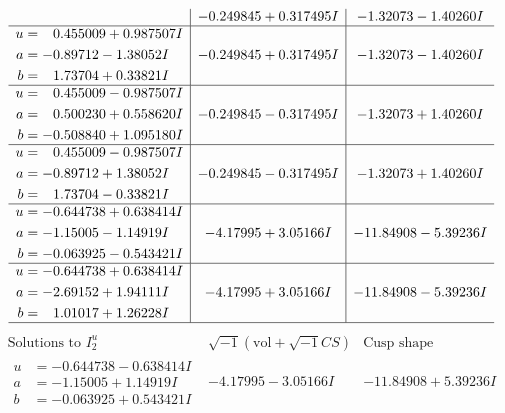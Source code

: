 \documentclass[1p]{elsarticle_modified}
\theoremstyle{definition}
\newcommand{\I}{\sqrt{-1}}
\begin{document}
$$\begin{array}{c|c|c}
 & -0.249845 + 0.317495 I & -1.32073 - 1.40260 I \\ \hline\begin{aligned}
u &= \phantom{-}0.455009 + 0.987507 I \\
a &= -0.89712 - 1.38052 I \\
b &= \phantom{-}1.73704 + 0.33821 I\end{aligned}
 & -0.249845 + 0.317495 I & -1.32073 - 1.40260 I \\ \hline\begin{aligned}
u &= \phantom{-}0.455009 - 0.987507 I \\
a &= \phantom{-}0.500230 + 0.558620 I \\
b &= -0.508840 + 1.095180 I\end{aligned}
 & -0.249845 - 0.317495 I & -1.32073 + 1.40260 I \\ \hline\begin{aligned}
u &= \phantom{-}0.455009 - 0.987507 I \\
a &= -0.89712 + 1.38052 I \\
b &= \phantom{-}1.73704 - 0.33821 I\end{aligned}
 & -0.249845 - 0.317495 I & -1.32073 + 1.40260 I \\ \hline\begin{aligned}
u &= -0.644738 + 0.638414 I \\
a &= -1.15005 - 1.14919 I \\
b &= -0.063925 - 0.543421 I\end{aligned}
 & -4.17995 + 3.05166 I & -11.84908 - 5.39236 I \\ \hline\begin{aligned}
u &= -0.644738 + 0.638414 I \\
a &= -2.69152 + 1.94111 I \\
b &= \phantom{-}1.01017 + 1.26228 I\end{aligned}
 & -4.17995 + 3.05166 I & -11.84908 - 5.39236 I\\
 \hline 
 \end{array}$$\newpage$$\begin{array}{c|c|c}  
\text{Solutions to }I^u_{2}& \I (\text{vol} + \sqrt{-1}CS) & \text{Cusp shape}\\
 \hline 
\begin{aligned}
u &= -0.644738 - 0.638414 I \\
a &= -1.15005 + 1.14919 I \\
b &= -0.063925 + 0.543421 I\end{aligned}
 & -4.17995 - 3.05166 I & -11.84908 + 5.39236 I \\ \hline\begin{aligned}

\end{aligned}
\end{array}$$
\end{document}
